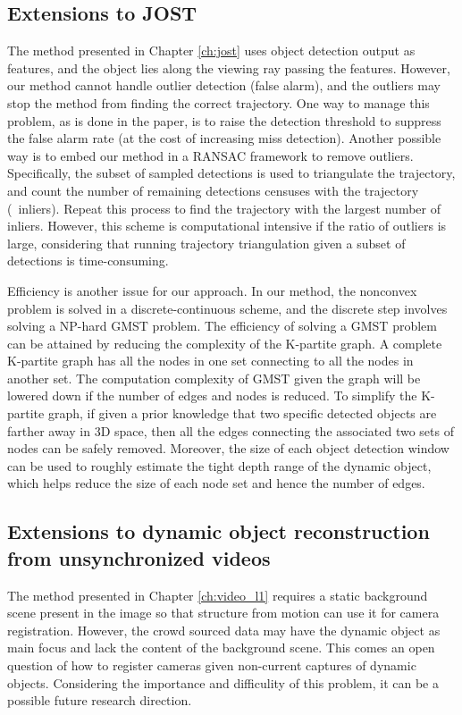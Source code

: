 \subsection{Extensions to JOST}

The method presented in Chapter \ref{ch:jost} uses object detection output as features, and the object lies along the viewing ray passing the features. However, our method cannot handle outlier detection (false alarm), and the outliers may stop the method from finding the correct trajectory. One way to manage this problem, as is done in the paper, is to raise the detection threshold to suppress the false alarm rate (at the cost of increasing miss detection). Another possible way is to embed our method in a RANSAC framework \cite{Hartley2004} to remove outliers. Specifically, the subset of sampled detections is used to triangulate the trajectory, and count the number of remaining detections censuses with the trajectory (\ie~inliers). Repeat this process to find the trajectory with the largest number of inliers. However, this scheme is computational intensive if the ratio of outliers is large, considering that running trajectory triangulation given  a subset of detections is time-consuming. 

Efficiency is another issue for our approach. In our method, the nonconvex problem is solved in a discrete-continuous scheme, and the discrete step involves solving a NP-hard GMST problem. The efficiency of solving a GMST problem can be attained by reducing the complexity of the K-partite graph. A complete K-partite graph has all the nodes in one set connecting to all the nodes in another set. The computation complexity of GMST given the graph will be lowered down if the number of edges and nodes is reduced. To simplify the K-partite graph, if given a prior knowledge that two specific detected objects are farther away in 3D space, then all the edges connecting the associated two sets of nodes can be safely removed. Moreover, the size of each object detection window can be used to roughly estimate the tight depth range of the dynamic object, which helps reduce the size of each node set and hence the number of edges.

\subsection{Extensions to dynamic object reconstruction from unsynchronized videos}

The method presented in Chapter \ref{ch:video_l1} requires a static background scene present in the image so that structure from motion can use it for camera registration. However, the crowd sourced data may have the dynamic object as main focus and lack the content of the background scene. This comes an open question of how to register cameras given non-current captures of dynamic objects. Considering the importance and difficulity of this problem, it can be a possible future research direction.

